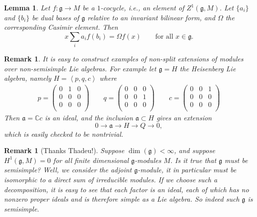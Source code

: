 \documentclass[12pt]{article}
\theoremstyle{plain}
\newtheorem{lemma}[thm]{Lemma}
\newtheorem{rem}[thm]{Remark}
\theoremstyle{definition}
\numberwithin{equation}{section}
\newcommand{\C}{\mathbb{C}}
\newcommand{\g}{\mathfrak{g}}
\newcommand{\ma}{\mathfrak{a}}
\begin{document}
\begin{lemma}\label{lem:Casimir.indentity}
Let $f : \g \rightarrow M$ be a $1$-cocycle, i.e., an element of $Z^1(\g, M)$. Let $\{a_i\}$ and $\{b_i\}$ be dual bases of $\g$ relative to an invariant bilinear form, and $\Omega$ the corresponding Casimir element. Then
\[
x \sum_i a_i f(b_i) = \Omega f(x) \qquad \text{for all $x \in \g$}.
\]
\end{lemma}

\begin{rem}
It is easy to construct examples of non-split extensions of modules over non-semisimple Lie algebras. For example let $\g = H$ the Heisenberg Lie algebra, namely $H = \left< p, q, c \right>$ where
\begin{align*}
p = \left(\begin{array}{ccc}
          0 & 1 & 0 \\
          0 & 0 & 0 \\
          0 & 0 & 0 \\
          \end{array}
\right)
\qquad
q = \left(\begin{array}{ccc}
          0 & 0 & 0 \\
          0 & 0 & 1 \\
          0 & 0 & 0 \\
          \end{array}
\right)
\qquad
c = \left(\begin{array}{ccc}
          0 & 0 & 1 \\
          0 & 0 & 0 \\
          0 & 0 & 0 \\
          \end{array}
\right)
\end{align*}
Then $\ma = \C c$ is an ideal, and the inclusion $\ma \subset H$ gives an extension
\[
0 \rightarrow \ma \rightarrow H \rightarrow Q \rightarrow 0,
\]
which is easily checked to be nontrivial.
\end{rem}

\begin{rem}[Thanks Thadeu!]
Suppose $\dim(\g) < \infty$, and suppose $H^1(\g, M) = 0$ for all finite dimensional $\g$-modules $M$. Is it true that $\g$ must be semisimple? Well, we consider the adjoint $\g$-module, it in particular must be isomorphic to a direct sum of irreducible modules. If we choose such a decomposition, it is easy to see that each factor is an ideal, each of which has no nonzero proper ideals and is therefore simple as a Lie algebra. So indeed such $\g$ is semisimple.
\end{rem}
\end{document}

